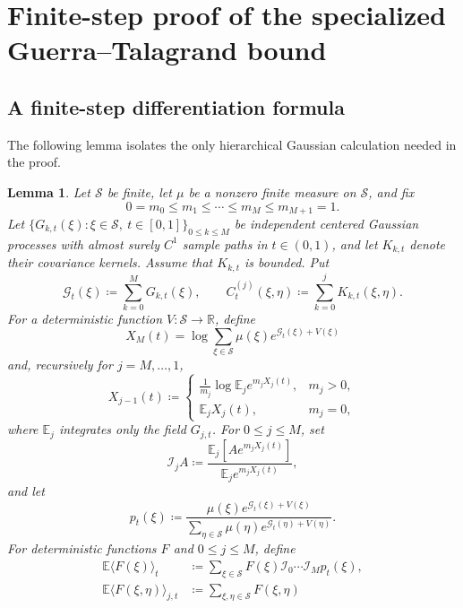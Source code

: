 \documentclass[11pt]{article}
\newtheorem{lemma}[theorem]{Lemma}
\numberwithin{equation}{section}
\newcommand{\E}{\mathbb{E}}
\newcommand{\1}{\mathbf 1}
\begin{document}
\appendix

\section{Finite-step proof of the specialized Guerra--Talagrand bound}
\label{app:specialGT}



\subsection{A finite-step differentiation formula}

The following lemma isolates the only hierarchical Gaussian calculation
needed in the proof.

\begin{lemma}
\label{lem:finite-step-interpolation-derivative}
Let $\mathcal S$ be finite, let $\mu$ be a nonzero finite measure on
$\mathcal S$, and fix
\[
0=m_0\leq m_1\leq\cdots\leq m_M\leq m_{M+1}=1.
\]
Let $\{G_{k,t}(\xi):\xi\in\mathcal S,\ t\in[0,1]\}_{0\le k\le M}$ be independent centered Gaussian processes with almost surely $C^1$ sample paths in $t \in (0,1)$, and let $K_{k,t}$ denote their covariance kernels. Assume that $K_{k,t}$ is bounded.  Put
\[
\mathcal G_t(\xi) \coloneqq \sum_{k=0}^M G_{k,t}(\xi),
\qquad
C_t^{(j)}(\xi,\eta) \coloneqq \sum_{k=0}^jK_{k,t}(\xi,\eta).
\]
For a deterministic function $V:\mathcal S\to\mathbb R$, define
\[
X_M(t)=\log\sum_{\xi\in \mathcal S}
\mu(\xi )e^{\mathcal G_t(\xi)+V(\xi)}
\]
and, recursively for $j=M,\ldots,1$,
\begin{equation}\label{eq:defXB1}
X_{j-1}(t) \coloneqq
\begin{cases}
\displaystyle
\frac1{m_j}\log\E_j e^{m_jX_j(t)},&m_j>0,\\[3mm]
\E_jX_j(t),&m_j=0,
\end{cases}
\end{equation}
where $\E_j$ integrates only the field $G_{j,t}$.  For
$0\leq j\leq M$, set
\[
\mathcal I_jA \coloneqq \frac{\E_j[Ae^{m_jX_j(t)}]}{\E_je^{m_jX_j(t)}},
\]
and let
\[
p_t(\xi) \coloneqq
\frac{\mu(\xi)e^{\mathcal G_t(\xi)+V(\xi)}}
{\sum_{\eta\in\mathcal S}
\mu(\eta)e^{\mathcal G_t(\eta)+V(\eta)}}.
\]
For deterministic functions $F$ and $0\leq j\leq M$, define
\begin{align*}
\E\langle F(\xi) \rangle_t
&\coloneqq \sum_{\xi\in\mathcal S}F(\xi)
\mathcal I_0\cdots\mathcal I_Mp_t(\xi),\\
\E\langle F(\xi,\eta)\rangle_{j,t}
&\coloneqq \sum_{\xi,\eta\in\mathcal S}F(\xi,\eta)

\end{align*}
\end{lemma}
\end{document}
